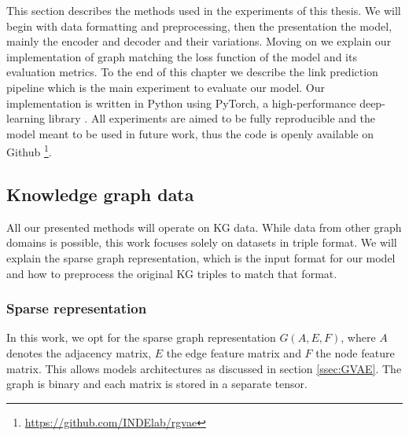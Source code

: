 This section describes the methods used in the experiments of this thesis. We will begin with data formatting and preprocessing, then the presentation the model, mainly the encoder and decoder and their variations. Moving on we explain our implementation of graph matching the loss function of the model and its evaluation metrics. To the end of this chapter we describe the link prediction pipeline which is the main experiment to evaluate our model. Our implementation is written in Python using PyTorch, a high-performance deep-learning library \cite{paszke_pytorch_2019}. All experiments are aimed to be fully reproducible and the model meant to be used in future work, thus the code is openly available on Github \footnote{\url{https://github.com/INDElab/rgvae}}.

\subsection{Knowledge graph data}
All our presented methods will operate on KG data. While data from other graph domains is possible, this work focuses solely on datasets in triple format. We will explain the sparse graph representation, which is the input format for our model and how to preprocess the original KG triples to match that format.

\subsubsection{Sparse representation}


In this work, we opt for the sparse graph representation $G(A,E,F)$, where $A$ denotes the adjacency matrix, $E$ the edge feature matrix and $F$ the node feature matrix. This allows models architectures as discussed in section \ref{ssec:GVAE}. The graph is binary and each matrix is stored in a separate tensor.

